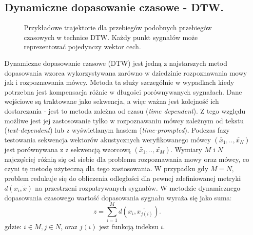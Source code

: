 \subsection{Dynamiczne dopasowanie czasowe - DTW.}

\begin{figure}
  \centering
    
    \caption{Przykładowe trajektorie  dla przebiegów podobnych przebiegów czasowych w technice DTW. Każdy punkt sygnałów może reprezentować pojedynczy wektor cech.}
    \label{dtw}
\end{figure}

Dynamiczne dopasowanie czasowe (DTW) jest jedną z najstarszych metod dopasowania wzorca \cite{multidsp} wykorzystywana zarówno w dziedzinie rozpoznawania mowy jak i rozpoznawania mówcy. Metoda ta służy szczególnie w wypadkach kiedy potrzebna jest kompensacja różnic w długości porównywanych sygnałach. Dane wejściowe są traktowane jako sekwencja, a więc ważna jest kolejność ich dostarczania - jest to metoda zależna od czasu (\textit{time dependent}). Z tego względu możliwe jest jej zastosowanie tylko w rozpoznawaniu mówcy zależnym od tekstu (\textit{text-dependent}) lub z wyświetlanym hasłem (\textit{time-prompted}). Podczas fazy testowania sekwencja wektorów akustycznych weryfikowanego mówcy $(\tilde{x_1},..,\tilde{x_N})$ jest porównywana z z sekwencją wzorcową $(\tilde{x_1},..,\tilde{x_M})$. Wymiary $M$ i $N$ najczęściej różnią się od siebie dla problemu rozpoznawania mowy oraz mówcy, co czyni tę metodę użyteczną dla tego zastosowania. W przypadku gdy $M=N$, problem redukuje się do obliczenia odległości dla pewnej zdefiniowanej metryki $d(x_i, \tilde{x})$ na przestrzeni rozpatrywanych sygnałów. W metodzie dynamicznego dopasowania czasowego wartość dopasowania sygnału wyraża się jako suma:
\begin{equation}
  z = \sum_{i=1}^{M} d(x_i,\tilde{x_{j(i)}}).
  \label{z}
\end{equation}
gdzie: $i \in M, j \in N$, oraz $j(i)$ jest funkcją indeksu $i$.


